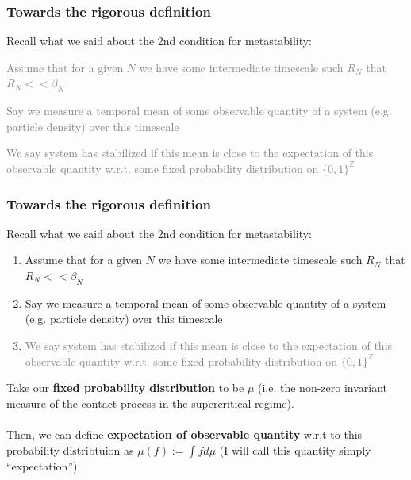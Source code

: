 \documentclass{beamer}
\begin{document}
\begin{frame}
    \frametitle{Towards the rigorous definition}

    Recall what we said about the 2nd condition for metastability:

    \begin{enumerate}
        \item \textcolor{gray}{Assume that for a given $N$ we have some intermediate timescale such $R_N$ that $R_N << \beta_N$
            \item Say we measure a temporal mean of some observable quantity of a system (e.g. particle density) over this timescale
            \item We say system has stabilized if this mean is close to the expectation of this observable quantity w.r.t. some fixed probability distribution on $\{0,1\}^{\mathbb{Z}}$}
    \end{enumerate}
\end{frame}

\begin{frame}
    \frametitle{Towards the rigorous definition}

    Recall what we said about the 2nd condition for metastability:

    \begin{enumerate}
            \item Assume that for a given $N$ we have some intermediate timescale such $R_N$ that $R_N << \beta_N$
            \item Say we measure a temporal mean of some observable quantity of a system (e.g. particle density) over this timescale
            \item \textcolor{gray}{We say system has stabilized if this mean is close to the expectation of this observable quantity w.r.t. some fixed probability distribution on $\{0,1\}^{\mathbb{Z}}$}
    \end{enumerate}
\end{frame}

\begin{frame}
    Take our \textbf{fixed probability distribution} to be $\mu$ (i.e. the non-zero invariant measure of the contact process in the supercritical regime). \\~\\

    Then, we can define \textbf{expectation of observable quantity} w.r.t to this probability distribtuion as $\mu(f) := \int fd\mu$ (I will call this quantity simply ``expectation'').
\end{frame}
\end{document}
